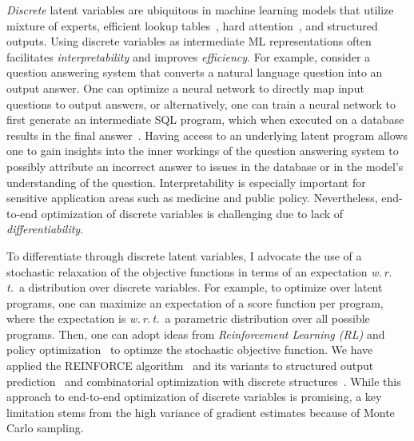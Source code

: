 \documentclass[a4paper, 10pt]{article}
\begin{document}
\hspace{\parindent} {\em Discrete} latent variables are ubiquitous in
machine learning models that utilize mixture of experts, efficient
lookup tables~\cite{mih}, hard attention~\cite{hardattention}, and
structured outputs. Using discrete variables as intermediate ML
representations often facilitates {\em interpretability} and improves
{\em efficiency}. For example, consider a question answering system
that converts a natural language question into an output answer. One
can optimize a neural network to directly map input questions to
output answers, or alternatively, one can train a neural network to
first generate an intermediate SQL program, which when executed on a
database results in the final answer~\cite{mapo}. Having access to an
underlying latent program allows one to gain insights into the inner
workings of the question answering system to possibly attribute an
incorrect answer to issues in the database or in the model's
understanding of the question. Interpretability is especially
important for sensitive application areas such as medicine and public
policy. Nevertheless, end-to-end optimization of discrete variables is
challenging due to lack of {\em differentiability}.

To differentiate through discrete latent variables, I advocate the use
of a stochastic relaxation of the objective functions in terms of an
expectation {\em w.\,r.\,t.}~a distribution over discrete
variables. For example, to optimize over latent programs, one can
maximize an expectation of a score function per program, where the
expectation is {\em w.\,r.\,t.}~a parametric distribution over all
possible programs.  Then, one can adopt ideas from {\em Reinforcement
Learning (RL)} and policy optimization~\cite{sutton1998reinforcement}
to optimze the stochastic objective function. We have applied the
REINFORCE algorithm~\cite{reinforce} and its variants to structured
output prediction~\cite{wu2016gnmt} and combinatorial optimization
with discrete structures~\cite{bello2016neural,azalia2017}. While this
approach to end-to-end optimization of discrete variables is
promising, a key limitation stems from the high variance of gradient
estimates because of Monte Carlo sampling.
\end{document}
